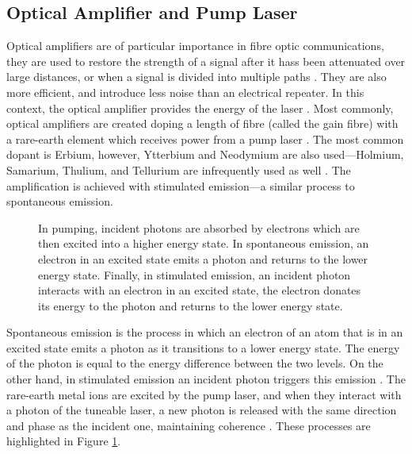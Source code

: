 \subsection{Optical Amplifier and Pump Laser}
Optical amplifiers are of particular importance in fibre optic communications, they are used to restore the strength of a signal after it hass been attenuated over large distances, or when a signal is divided into multiple paths \cite{alazzawi, starodoumov}. They are also more efficient, and introduce less noise than an electrical repeater. In this context, the optical amplifier provides the energy of the laser \cite{alazzawi}. Most commonly, optical amplifiers are created  doping a length of fibre (called the gain fibre) with a rare-earth element which receives power from a pump laser \cite{agrawal2002, alazzawi, starodoumov}. The most common dopant is Erbium, however, Ytterbium and Neodymium are also used---Holmium, Samarium, Thulium, and Tellurium are infrequently used as well \cite{agrawal2002}. The amplification is achieved with stimulated emission---a similar process to spontaneous emission. \\

\begin{figure}[tbp]
\centering

\caption{In pumping, incident photons are absorbed by electrons which are then excited into a higher energy state. In spontaneous emission, an electron in an excited state emits a photon and returns to the lower energy state. Finally, in stimulated emission, an incident photon interacts with an electron in an excited state, the electron donates its energy to the photon and returns to the lower energy state.}
\label{fig:emission}
\end{figure}

Spontaneous emission is the process in which an electron of an atom that is in an excited state emits a photon as it transitions to a lower energy state. The energy of the photon is equal to the energy difference between the two levels. On the other hand, in stimulated emission an incident photon triggers this emission \cite{alazzawi}. The rare-earth metal ions are excited by the pump laser, and when they interact with a photon of the tuneable laser, a new photon is released with the same direction and phase as the incident one, maintaining coherence \cite{alazzawi}. These processes are highlighted in Figure \ref{fig:emission}. \\

